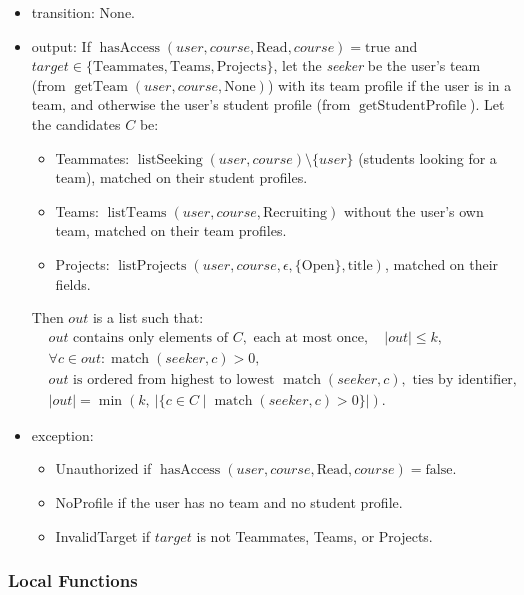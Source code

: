 \documentclass[12pt, titlepage]{article}
\begin{document}
\begin{itemize}
    \item transition: None.
    \item output: If $\operatorname{hasAccess}(user,course,\text{Read},course)=\text{true}$ and $target\in\{\text{Teammates},\text{Teams},\text{Projects}\}$, let the \emph{seeker} be the user's team (from $\operatorname{getTeam}(user,course,\text{None})$) with its team profile if the user is in a team, and otherwise the user's student profile (from $\operatorname{getStudentProfile}$). Let the candidates $C$ be:
    \begin{itemize}
        \item Teammates: $\operatorname{listSeeking}(user,course)\setminus\{user\}$ (students looking for a team), matched on their student profiles.
        \item Teams: $\operatorname{listTeams}(user,course,\text{Recruiting})$ without the user's own team, matched on their team profiles.
        \item Projects: $\operatorname{listProjects}(user,course,\epsilon,\{\text{Open}\},\text{title})$, matched on their fields.
    \end{itemize}
    Then $out$ is a list such that:
    \[
    \begin{aligned}
    &out\text{ contains only elements of }C,\text{ each at most once},\quad|out|\le k,\\
    &\forall c\in out:\operatorname{match}(\mathit{seeker},c)>0,\\
    &out\text{ is ordered from highest to lowest }\operatorname{match}(\mathit{seeker},c),\text{ ties by identifier},\\
    &|out|=\min\left(k,\ |\{c\in C\mid\operatorname{match}(\mathit{seeker},c)>0\}|\right).
    \end{aligned}
    \]
    \item exception:
    \begin{itemize}
        \item Unauthorized if $\operatorname{hasAccess}(user,course,\text{Read},course)=\text{false}$.
        \item NoProfile if the user has no team and no student profile.
        \item InvalidTarget if $target$ is not Teammates, Teams, or Projects.
    \end{itemize}
\end{itemize}

\subsubsection{Local Functions}
\end{document}
